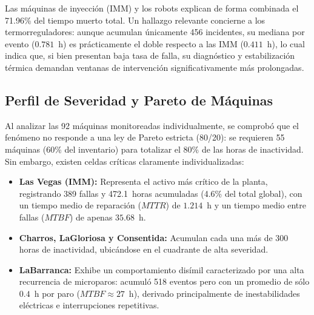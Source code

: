 \documentclass[conference]{IEEEtran}
\begin{document}
Las máquinas de inyección (IMM) y los robots explican de forma combinada el 71.96\% del tiempo muerto total. Un hallazgo relevante concierne a los termorreguladores: aunque acumulan únicamente 456 incidentes, su mediana por evento ($0.781$~h) es prácticamente el doble respecto a las IMM ($0.411$~h), lo cual indica que, si bien presentan baja tasa de falla, su diagnóstico y estabilización térmica demandan ventanas de intervención significativamente más prolongadas.

\subsection{Perfil de Severidad y Pareto de Máquinas}
Al analizar las 92 máquinas monitoreadas individualmente, se comprobó que el fenómeno no responde a una ley de Pareto estricta (80/20): se requieren 55 máquinas (60\% del inventario) para totalizar el 80\% de las horas de inactividad. Sin embargo, existen celdas críticas claramente individualizadas:
\begin{itemize}
    \item \textbf{Las Vegas (IMM):} Representa el activo más crítico de la planta, registrando 389 fallas y 472.1~horas acumuladas (4.6\% del total global), con un tiempo medio de reparación ($MTTR$) de $1.214$~h y un tiempo medio entre fallas ($MTBF$) de apenas $35.68$~h.
    \item \textbf{Charros, LaGloriosa y Consentida:} Acumulan cada una más de 300 horas de inactividad, ubicándose en el cuadrante de alta severidad.
    \item \textbf{LaBarranca:} Exhibe un comportamiento disímil caracterizado por una alta recurrencia de microparos: acumuló 518 eventos pero con un promedio de sólo $0.4$~h por paro ($MTBF \approx 27$~h), derivado principalmente de inestabilidades eléctricas e interrupciones repetitivas.
\end{itemize}
\end{document}
